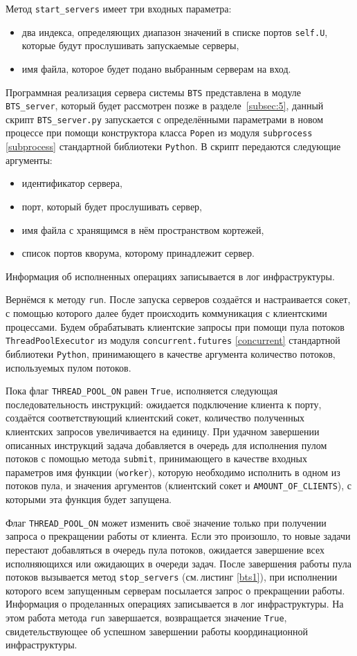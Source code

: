 Метод \texttt{start_servers} имеет три входных параметра:
\begin{itemize}
	\item два индекса, определяющих диапазон значений в списке портов \texttt{self.U}, которые будут прослушивать запускаемые серверы,
	\item имя файла, которое будет подано выбранным серверам на вход.
\end{itemize}
Программная реализация сервера системы \texttt{BTS} представлена в модуле \texttt{BTS_server}, который будет рассмотрен позже в разделе~\ref{subsec:5}, данный скрипт \texttt{BTS_server.py} запускается с определёнными параметрами в новом процессе при помощи конструктора класса \texttt{Popen} из модуля \texttt{subprocess} \ref{subprocess} стандартной библиотеки \texttt{Python}. В скрипт передаются следующие аргументы:
\begin{itemize}
	\item идентификатор сервера,
	\item порт, который будет прослушивать сервер,
	\item имя файла с хранящимся в нём пространством кортежей,
	\item список портов кворума, которому принадлежит сервер.
\end{itemize}
Информация об исполненных операциях записывается в лог инфраструктуры.

Вернёмся к методу \texttt{run}. После запуска серверов создаётся и настраивается сокет, с помощью которого далее будет происходить коммуникация с клиентскими процессами. Будем обрабатывать клиентские запросы при помощи пула потоков \texttt{ThreadPoolExecutor} из модуля \texttt{concurrent.futures} \ref{concurrent} стандартной библиотеки \texttt{Python}, принимающего в качестве аргумента количество потоков, используемых пулом потоков.

Пока флаг \texttt{THREAD_POOL_ON} равен \texttt{True}, исполняется следующая последовательность инструкций: ожидается подключение клиента к порту, создаётся соответствующий клиентский сокет, количество полученных клиентских запросов увеличивается на единицу. При удачном завершении описанных инструкций задача добавляется в очередь для исполнения пулом потоков с помощью метода \texttt{submit}, принимающего в качестве входных параметров имя функции (\texttt{worker}), которую необходимо исполнить в одном из потоков пула, и значения аргументов (клиентский сокет и \texttt{AMOUNT_OF_CLIENTS}), с которыми эта функция будет запущена.

Флаг \texttt{THREAD_POOL_ON} может изменить своё значение только при получении запроса о прекращении работы от клиента. Если это произошло, то новые задачи перестают добавляться в очередь пула потоков, ожидается завершение всех исполняющихся или ожидающих в очереди задач. После завершения работы пула потоков вызывается метод \texttt{stop_servers} (см.\,листинг \ref{bts1}), при исполнении которого всем запущенным серверам посылается запрос о прекращении работы. Информация о проделанных операциях записывается в лог инфраструктуры. На этом работа метода \texttt{run} завершается, возвращается значение \texttt{True}, свидетельствующее об успешном завершении работы координационной инфраструктуры.

